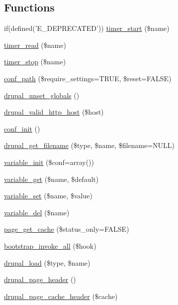 \subsection*{Functions}
\begin{CompactItemize}
\item 
if(defined('E\_\-DEPRECATED')) \hyperlink{bootstrap_8inc_a033ad6f8e530b98c9024a20e554423b}{timer\_\-start} (\$name)
\item 
\hyperlink{bootstrap_8inc_d093007ebd04feb2a1394ff5774eb6d4}{timer\_\-read} (\$name)
\item 
\hyperlink{bootstrap_8inc_8cb56b8962398895710c35a3584a7d11}{timer\_\-stop} (\$name)
\item 
\hyperlink{bootstrap_8inc_cef612ef19c49f6259531f0bee5c26cc}{conf\_\-path} (\$require\_\-settings=TRUE, \$reset=FALSE)
\item 
\hyperlink{bootstrap_8inc_f4eb5dc356848a28e53aed5ee6eff6a8}{drupal\_\-unset\_\-globals} ()
\item 
\hyperlink{bootstrap_8inc_e65d9d5f6c34309eb884e51fd39ffb6d}{drupal\_\-valid\_\-http\_\-host} (\$host)
\item 
\hyperlink{bootstrap_8inc_fedab27d166f281dfc2b4068866ab896}{conf\_\-init} ()
\item 
\hyperlink{bootstrap_8inc_e2af73b6b16cc9d723e931748aa6c853}{drupal\_\-get\_\-filename} (\$type, \$name, \$filename=NULL)
\item 
\hyperlink{bootstrap_8inc_222324598cdafc327254344a6c2d2aa2}{variable\_\-init} (\$conf=array())
\item 
\hyperlink{bootstrap_8inc_ba5d67193d1f9d9fd4636cff54fc4154}{variable\_\-get} (\$name, \$default)
\item 
\hyperlink{bootstrap_8inc_9859faa6fcd56ca6048be93dace95999}{variable\_\-set} (\$name, \$value)
\item 
\hyperlink{bootstrap_8inc_7850bff5f313f85335f418e6d87606b1}{variable\_\-del} (\$name)
\item 
\hyperlink{bootstrap_8inc_51e89d55fa18dc4ba2ae09a1f5f936ef}{page\_\-get\_\-cache} (\$status\_\-only=FALSE)
\item 
\hyperlink{bootstrap_8inc_3f13159d2e93ecfd09823d8dca30f5d9}{bootstrap\_\-invoke\_\-all} (\$hook)
\item 
\hyperlink{bootstrap_8inc_13a2254228f213a980dc1f09886b8802}{drupal\_\-load} (\$type, \$name)
\item 
\hyperlink{bootstrap_8inc_05f3dc0377da7898b9cb53977c30cca6}{drupal\_\-page\_\-header} ()
\item 
\hyperlink{bootstrap_8inc_e493c235ee5e28b3b5c664db14294dce}{drupal\_\-page\_\-cache\_\-header} (\$cache)

\end{CompactItemize}
